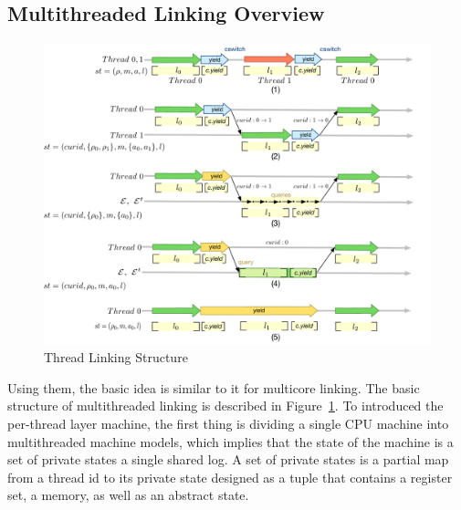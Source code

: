 
\subsection{Multithreaded Linking Overview}
\label{chapter:linking:subsec:multithreaded-linking-overview}

\begin{figure}
\begin{center}
\includegraphics[width=\textwidth]{figs/conlink/thread-linking}
\end{center}
\caption{Thread Linking Structure}
\label{fig:chapter:conlink:threadlinking}
\end{figure}

Using them, the basic idea is similar to it for multicore linking. 
The basic structure of multithreaded linking is described in Figure~\ref{fig:chapter:conlink:threadlinking}.
To introduced the per-thread layer machine, 
the first thing is dividing a single CPU machine into multithreaded machine models,
which implies that the state of the machine is 
a set of private states a single shared log. 
A set of private states is a partial map from a thread id to its private state designed as a tuple that contains 
a register set, a memory, as well as an abstract state. 

